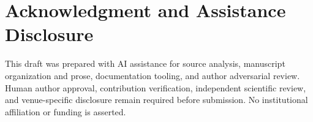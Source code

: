 \section*{Acknowledgment and Assistance Disclosure}
This draft was prepared with AI assistance for source analysis, manuscript organization and prose, documentation tooling, and author adversarial review. Human author approval, contribution verification, independent scientific review, and venue-specific disclosure remain required before submission. No institutional affiliation or funding is asserted.

